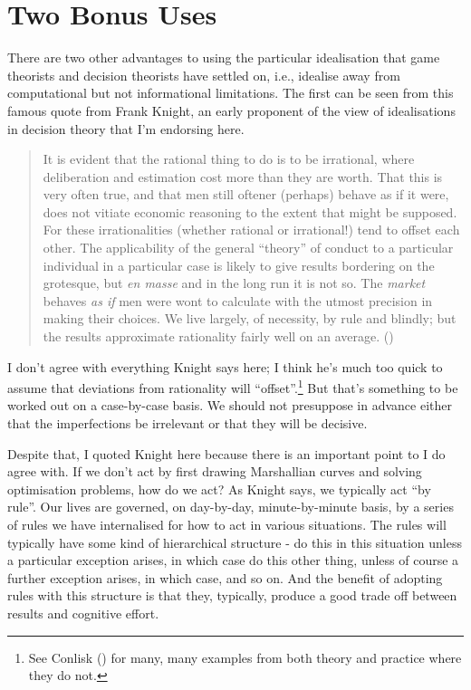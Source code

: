 \documentclass[
  12pt,
  letterpaper,
  DIV=11,
  numbers=noendperiod]{scrreprt}
\begin{document}
\section{Two Bonus Uses}\label{sec-ideal-bonus}

There are two other advantages to using the particular idealisation that
game theorists and decision theorists have settled on, i.e., idealise
away from computational but not informational limitations. The first can
be seen from this famous quote from Frank Knight, an early proponent of
the view of idealisations in decision theory that I'm endorsing here.

\begin{quote}
It is evident that the rational thing to do is to be irrational, where
deliberation and estimation cost more than they are worth. That this is
very often true, and that men still oftener (perhaps) behave as if it
were, does not vitiate economic reasoning to the extent that might be
supposed. For these irrationalities (whether rational or irrational!)
tend to offset each other. The applicability of the general ``theory''
of conduct to a particular individual in a particular case is likely to
give results bordering on the grotesque, but \emph{en masse} and in the
long run it is not so. The \emph{market} behaves \emph{as if} men were
wont to calculate with the utmost precision in making their choices. We
live largely, of necessity, by rule and blindly; but the results
approximate rationality fairly well on an average.
()
\end{quote}

I don't agree with everything Knight says here; I think he's much too
quick to assume that deviations from rationality will
``offset''.\footnote{See Conlisk () for
  many, many examples from both theory and practice where they do not.}
But that's something to be worked out on a case-by-case basis. We should
not presuppose in advance either that the imperfections be irrelevant or
that they will be decisive.

Despite that, I quoted Knight here because there is an important point
to I do agree with. If we don't act by first drawing Marshallian curves
and solving optimisation problems, how do we act? As Knight says, we
typically act ``by rule''. Our lives are governed, on day-by-day,
minute-by-minute basis, by a series of rules we have internalised for
how to act in various situations. The rules will typically have some
kind of hierarchical structure - do this in this situation unless a
particular exception arises, in which case do this other thing, unless
of course a further exception arises, in which case, and so on. And the
benefit of adopting rules with this structure is that they, typically,
produce a good trade off between results and cognitive effort.
\end{document}
